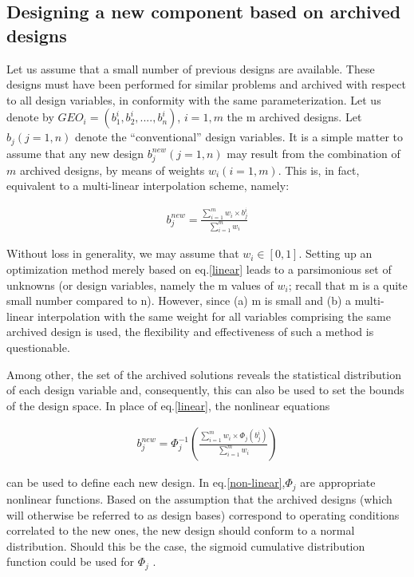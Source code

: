 \subsection{Designing a new component based on archived designs}
Let us assume that a small number of previous designs are available. These designs must have been performed for similar problems and archived with respect to all design variables, in conformity with the same parameterization. Let us denote by $GEO_i=(b_1^i,b_2^i,....,b_n^i)$, $i=1,m$ the m archived designs. Let $b_j (j=1,n)$ denote the “conventional” design variables. It is a simple matter to assume that any new design $b_j^{new} (j=1,n)$ may result from the combination of $m$ archived designs, by means of weights $w_i (i=1,m)$. This is, in fact, equivalent to a multi-linear interpolation scheme, namely:

\begin{eqnarray}
   b_j^{new} = \frac{\sum_{i=1}^{m}w_i \times b_j^i}{\sum_{i=1}^{m}w_i } 
   \label{linear} 
\end{eqnarray}

Without loss in generality, we may assume that $w_i \in [0,1]$. Setting up an optimization method merely based on eq.\ref{linear} leads to a parsimonious set of unknowns (or design variables, namely the m values of $w_i$; recall that m is a quite small number compared to n). However, since (a) m is small and (b) a multi-linear interpolation with the same weight for all variables comprising the same archived design is used, the flexibility and effectiveness of such a method is questionable. 

Among other, the set of the archived solutions reveals the statistical distribution of each design variable and, consequently, this can also be used to set the bounds of the design space. In place of eq.\ref{linear}, the nonlinear equations

\begin{eqnarray}
   b_j^{new} = \Phi _j^{-1} (\frac{\sum_{i=1}^{m}w_i \times \Phi _j(b_j^i)}{\sum_{i=1}^{m}w_i }) 
   \label{non-linear} 
\end{eqnarray}

can be used to define each new design. In eq.\ref{non-linear},$\Phi _j$ are appropriate nonlinear functions. Based on the assumption that the archived designs (which will otherwise be referred to as design bases) correspond to operating conditions correlated to the new ones, the new design should conform to a normal distribution. Should this be the case, the sigmoid cumulative distribution function could be used for $\Phi _j$  \cite{Kiemele}. 

